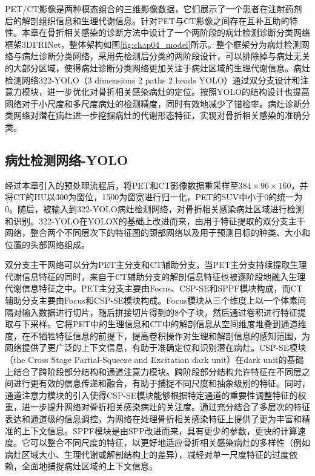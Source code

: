 PET/CT影像是两种模态组合的三维影像数据，它们展示了一个患者在注射药剂后的解剖组织信息和生理代谢信息。针对PET与CT影像之间存在互补互助的特性。本章在骨折相关感染的诊断方法中设计了一个两阶段的病灶检测诊断分类网络框架3DFRINet，整体架构如图\ref{fig:chap04_model}所示。整个框架分为病灶检测网络与病灶诊断分类网络，采用先检测后分类的两阶段设计，可以排除掉与病灶无关的大部分区域，使得病灶诊断分类网络更加关注于病灶区域的生理代谢信息。病灶检测网络322-YOLO（3 dimensions 2 paths 2 heads YOLO）通过双分支设计和注意力模块，进一步优化对骨折相关感染病灶的定位。按照YOLO的结构设计也提高网络对于小尺度和多尺度病灶的检测精度，同时有效地减少了错检率。病灶诊断分类网络对潜在病灶进一步挖掘病灶的代谢形态特征，实现对骨折相关感染的准确分类。


\subsection{病灶检测网络{-YOLO}}

经过本章引入的预处理流程后，将PET和CT影像数据重采样至\(384 \times 96\times 160\)，并将CT的HU以300为窗位，1500为窗宽进行归一化，PET的SUV中小于0的统一为0。随后，被输入到322-YOLO病灶检测网络，对骨折相关感染病灶区域进行检测和识别。322-YOLO在YOLOX\cite{ge2021yolox}的基础上改进而来，由用于特征提取的双分支主干网络，整合两个不同层次下的特征图的颈部网络以及用于预测目标的种类、大小和位置的头部网络组成。

双分支主干网络可以分为PET主分支和CT辅助分支，当PET主分支持续提取生理代谢信息特征的同时，来自于CT辅助分支的解剖信息特征也被逐阶段地融入生理代谢信息特征之中。PET主分支主要由Focus、CSP-SE和SPPF模块构成，而CT辅助分支主要由Focus和CSP-SE模块构成。Focus模块从三个维度上以一个体素间隔对输入数据进行切片，随后拼接切片得到的8个子块，然后通过卷积进行特征提取与下采样。它将PET中的生理信息和CT中的解剖信息从空间维度堆叠到通道维度，在不牺牲特征信息的前提下，提高卷积操作对生理和解剖信息的感知范围，为网络提供了更广泛的上下文信息，有助于准确定位和识别潜在病灶。CSP-SE模块（the Cross Stage Partial-Squeeze and Excitation dark unit）在dark unit的基础上结合了跨阶段部分结构\cite{wang2020cspnet}和通道注意力模块\cite{hu2018squeeze}。跨阶段部分结构允许特征在不同层之间进行更有效的信息传递和融合，有助于捕捉不同尺度和抽象级别的特征。同时，通道注意力模块的引入使得CSP-SE模块能够根据特定通道的重要性调整特征的权重，进一步提升网络对骨折相关感染病灶的关注度。通过充分结合了多层次的特征表达和通道级的信息调控，为网络在处理骨折相关感染特征上提供了更为丰富和精准的上下文信息。SPPF模块是由SPP\cite{he2015spatial}改进而来，具有更少的参数，更快的计算速度。它可以整合不同尺度的特征，以更好地适应骨折相关感染病灶的多样性（例如病灶区域大小、生理代谢或解剖结构上的差异），减轻对单一尺度特征的过度依赖，全面地捕捉病灶区域的上下文信息。

